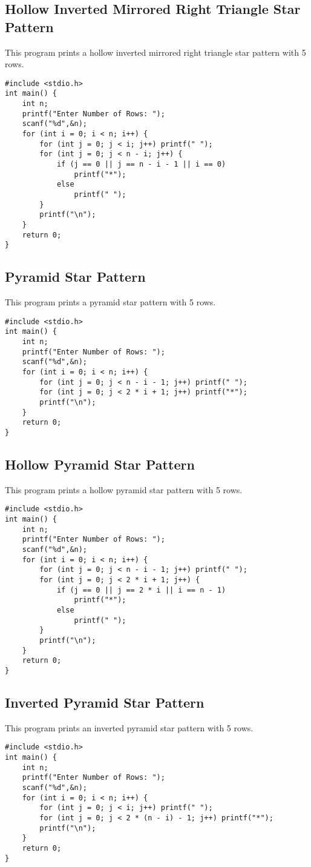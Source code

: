 \documentclass[a4paper,12pt]{article}
\begin{document}
\subsection{Hollow Inverted Mirrored Right Triangle Star Pattern}
This program prints a hollow inverted mirrored right triangle star pattern with 5 rows.
\begin{lstlisting}[caption={Hollow Inverted Mirrored Right Triangle Star Pattern}]
#include <stdio.h>
int main() {
    int n;
    printf("Enter Number of Rows: ");
    scanf("%d",&n);
    for (int i = 0; i < n; i++) {
        for (int j = 0; j < i; j++) printf(" ");
        for (int j = 0; j < n - i; j++) {
            if (j == 0 || j == n - i - 1 || i == 0)
                printf("*");
            else
                printf(" ");
        }
        printf("\n");
    }
    return 0;
}
\end{lstlisting}
\clearpage

\subsection{Pyramid Star Pattern}
This program prints a pyramid star pattern with 5 rows.
\begin{lstlisting}[caption={Pyramid Star Pattern}]
#include <stdio.h>
int main() {
    int n;
    printf("Enter Number of Rows: ");
    scanf("%d",&n);
    for (int i = 0; i < n; i++) {
        for (int j = 0; j < n - i - 1; j++) printf(" ");
        for (int j = 0; j < 2 * i + 1; j++) printf("*");
        printf("\n");
    }
    return 0;
}
\end{lstlisting}
\clearpage

\subsection{Hollow Pyramid Star Pattern}
This program prints a hollow pyramid star pattern with 5 rows.
\begin{lstlisting}[caption={Hollow Pyramid Star Pattern}]
#include <stdio.h>
int main() {
    int n;
    printf("Enter Number of Rows: ");
    scanf("%d",&n);
    for (int i = 0; i < n; i++) {
        for (int j = 0; j < n - i - 1; j++) printf(" ");
        for (int j = 0; j < 2 * i + 1; j++) {
            if (j == 0 || j == 2 * i || i == n - 1)
                printf("*");
            else
                printf(" ");
        }
        printf("\n");
    }
    return 0;
}
\end{lstlisting}
\clearpage

\subsection{Inverted Pyramid Star Pattern}
This program prints an inverted pyramid star pattern with 5 rows.
\begin{lstlisting}[caption={Inverted Pyramid Star Pattern}]
#include <stdio.h>
int main() {
    int n;
    printf("Enter Number of Rows: ");
    scanf("%d",&n);
    for (int i = 0; i < n; i++) {
        for (int j = 0; j < i; j++) printf(" ");
        for (int j = 0; j < 2 * (n - i) - 1; j++) printf("*");
        printf("\n");
    }
    return 0;
}
\end{lstlisting}
\clearpage
\end{document}
